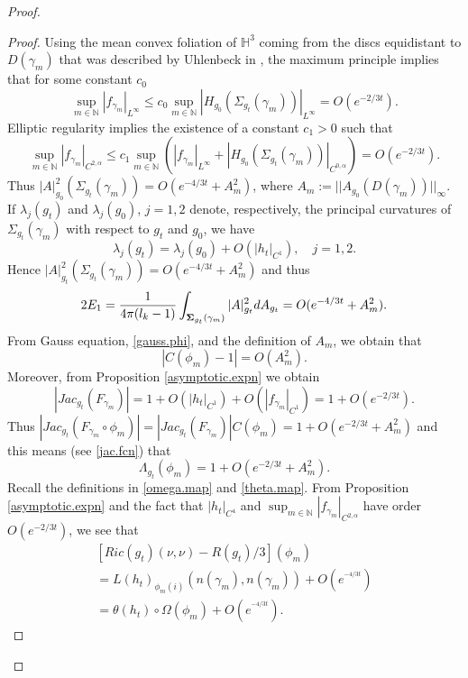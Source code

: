 \documentclass[11pt]{amsart}
\def\H{\mathbb H}
\def\N{\mathbb N}
\theoremstyle{remark}
\theoremstyle{definition}
\begin{document}
{{\begin{proof}
\begin{proof}
			Using the mean convex foliation of $\H^3$ coming from the discs equidistant to $D(\gamma_m)$ that was described by Uhlenbeck in \cite[Theorem 3.3]{uhlenbeck}, the maximum principle implies that  for some constant $c_0$
			$$\sup_{m\in\N} |f_{\gamma_m}|_{L^\infty}\leq c_0\sup_{m\in\N} |H_{g_0}(\Sigma_{g_t}(\gamma_m))|_{L^{\infty}}=O(e^{-2/3t}).$$
			Elliptic regularity implies the existence of a  constant $c_1>0$ such that $$\sup_{m\in\N}|f_{\gamma_m}|_{C^{2,\alpha}}\leq c_1\sup_{m\in\N} (|f_{\gamma_m}|_{L^\infty}+|H_{g_0}(\Sigma_{g_t}(\gamma_m))|_{C^{0,\alpha}})=O(e^{-2/3t}).$$ 
			Thus $|A|^2_{g_0}(\Sigma_{g_t}(\gamma_m))=O(e^{-4/3t}+A_m^2)$, where $A_m:=||A_{g_0}(D(\gamma_m))||_{\infty}$. If $\lambda_j(g_t)$ and $\lambda_j(g_0)$, $j=1,2$ denote, respectively, the principal curvatures of $\Sigma_{g_t}(\gamma_m)$ with respect to $g_t$  and $g_0$, we have
			$$\lambda_j(g_t)=\lambda_j(g_0)+O(|h_t|_{C^1}),\quad j=1,2.$$ 
			Hence $|A|^2_{g_t}(\Sigma_{g_t}(\gamma_m))=O(e^{-4/3t}+A_m^2)$ and thus
			\begin{equation}\label{estimateA}
				2E_1=\frac{1}{4\pi(l_k-1)}\int_{{\bf \Sigma}_{g_t}(\gamma_m)}|A|_{g_t}^2dA_{g_t}=O(e^{-4/3t}+A_m^2).
			\end{equation}
			From Gauss equation, \eqref{gauss.phi}, and {the definition of $A_m$,} we obtain that
			$$|C(\phi_m)-1|= {O(A_m^2)}.$$ Moreover, from Proposition \ref{asymptotic.expn} we obtain 
			\begin{equation*}
				|Jac_{g_t}(F_{\gamma_m})|=1+O(|h_t|_{C^1})+O(|f_{\gamma_m}|_{C^1})=1+O(e^{-2/3t}).
			\end{equation*}
			Thus $|Jac_{g_t}(F_{\gamma_m}\circ\phi_m)|=|Jac_{g_t}(F_{\gamma_m})|C(\phi_m)=1+O(e^{-2/3t}+A_m^2)$ and this means  (see \eqref{jac.fcn}) that
			\begin{equation}\label{estimate.jac}
				\Lambda_{g_t}(\phi_m)=1+O(e^{-2/3t}+A_m^2).
			\end{equation}
			Recall the definitions in \eqref{omega.map} and  \eqref{theta.map}. {From Proposition \ref{asymptotic.expn}  and the fact that $|h_t|_{C^4}$ and  $\sup_{m\in\N}|f_{\gamma_m}|_{C^{2,\alpha}}$ have order $O(e^{-2/3t})$, we see that}{
				\begin{multline}\label{first.expn}
					[Ric(g_t)(\nu,\nu)-R(g_t)/3](\phi_m)\\
					=L(h_t)_{\phi_m(i)}(n(\gamma_m),n(\gamma_m))
					+O(e^{^{-4/3t}})\\
					=\theta(h_t)\circ\Omega(\phi_m)+O(e^{^{-4/3t}}).
			\end{multline}}

\end{proof}
\end{proof}}}
\end{document}

